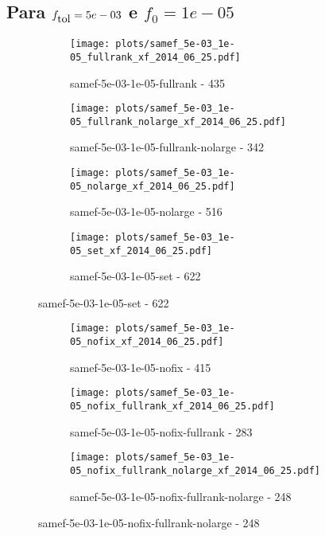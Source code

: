 \newpage
\subsection{Para $f_{\mbox{tol}} = 5e-03$ e $f_0 = 1e-05$}

\begin{figure}[H]
  \centering
  \begin{subfigure}{0.48\textwidth}
    \texttt{[image: plots/samef\_5e-03\_1e-05\_fullrank\_xf\_2014\_06\_25.pdf]}
    \caption{samef-5e-03-1e-05-fullrank - 435}
  \end{subfigure}
  \begin{subfigure}{0.48\textwidth}
    \texttt{[image: plots/samef\_5e-03\_1e-05\_fullrank\_nolarge\_xf\_2014\_06\_25.pdf]}
    \caption{samef-5e-03-1e-05-fullrank-nolarge - 342}
  \end{subfigure}
  \begin{subfigure}{0.48\textwidth}
    \texttt{[image: plots/samef\_5e-03\_1e-05\_nolarge\_xf\_2014\_06\_25.pdf]}
    \caption{samef-5e-03-1e-05-nolarge - 516}
  \end{subfigure}
  \begin{subfigure}{0.48\textwidth}
    \texttt{[image: plots/samef\_5e-03\_1e-05\_set\_xf\_2014\_06\_25.pdf]}
    \caption{samef-5e-03-1e-05-set - 622}
  \end{subfigure}
\end{figure}
\begin{figure}[H]
  \centering
  \begin{subfigure}{0.48\textwidth}
    \texttt{[image: plots/samef\_5e-03\_1e-05\_nofix\_xf\_2014\_06\_25.pdf]}
    \caption{samef-5e-03-1e-05-nofix - 415}
  \end{subfigure}
  \begin{subfigure}{0.48\textwidth}
    \texttt{[image: plots/samef\_5e-03\_1e-05\_nofix\_fullrank\_xf\_2014\_06\_25.pdf]}
    \caption{samef-5e-03-1e-05-nofix-fullrank - 283}
  \end{subfigure}
  \begin{subfigure}{0.48\textwidth}
    \texttt{[image: plots/samef\_5e-03\_1e-05\_nofix\_fullrank\_nolarge\_xf\_2014\_06\_25.pdf]}
    \caption{samef-5e-03-1e-05-nofix-fullrank-nolarge - 248}
  \end{subfigure}
\end{figure}

